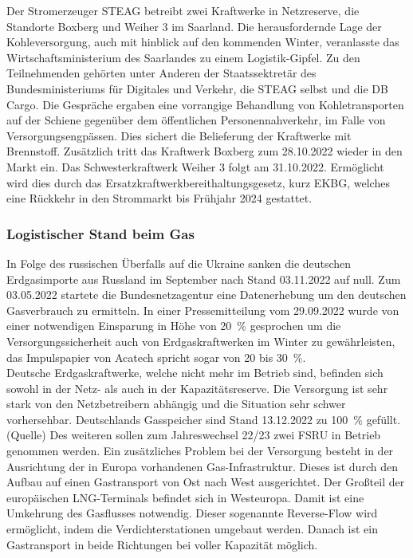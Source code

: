 	Der Stromerzeuger STEAG betreibt zwei Kraftwerke in Netzreserve, die Standorte Boxberg und Weiher 3 im Saarland. Die herausfordernde Lage der Kohleversorgung, auch mit hinblick auf den kommenden Winter, veranlasste das Wirtschaftsministerium des Saarlandes zu einem Logistik-Gipfel. Zu den Teilnehmenden gehörten unter Anderen der Staatssektretär des Bundesministeriums für Digitales und Verkehr, die STEAG selbst und die DB Cargo. Die Gespräche ergaben eine vorrangige Behandlung von Kohletransporten auf der Schiene gegenüber dem öffentlichen Personennahverkehr, im Falle von Versorgungsengpässen.\cite{Logistikgipfel_Saarland} Dies sichert die Belieferung der Kraftwerke mit Brennstoff. Zusätzlich tritt das Kraftwerk Boxberg zum 28.10.2022 wieder in den Markt ein. Das Schwesterkraftwerk Weiher 3 folgt am 31.10.2022. Ermöglicht wird dies durch das Ersatzkraftwerkbereithaltungsgesetz, kurz EKBG, welches eine Rückkehr in den Strommarkt bis Frühjahr 2024 gestattet.\cite{STEAG_Steinkohle} \\
	
	
	\subsubsection{Logistischer Stand beim Gas}
	In Folge des russischen Überfalls auf die Ukraine sanken die deutschen Erdgasimporte aus Russland im September nach Stand 03.11.2022 auf null. Zum 03.05.2022 startete die Bundesnetzagentur eine Datenerhebung um den deutschen Gasverbrauch zu ermitteln.\cite{Datenerhebung_Gas} In einer Pressemitteilung vom 29.09.2022 wurde von einer notwendigen Einsparung in Höhe von \SI{20}{\percent} gesprochen um die Versorgungssicherheit auch von Erdgaskraftwerken im Winter zu gewährleisten, das Impulspapier von Acatech spricht sogar von 20 bis \SI{30}{\percent}.\cite{Impuls_Acatech_Einsparung}\\
	
	Deutsche Erdgaskraftwerke, welche nicht mehr im Betrieb sind, befinden sich sowohl in der Netz- als auch in der Kapazitätsreserve. Die Versorgung ist sehr stark von den Netzbetreibern abhängig und die Situation sehr schwer vorhersehbar. Deutschlands Gasspeicher sind Stand 13.12.2022 zu \SI{100}{\percent} gefüllt.(Quelle) Des weiteren sollen zum Jahreswechsel 22/23 zwei FSRU in Betrieb genommen werden.\cite{LNG_FSRU}
	Ein zusätzliches Problem bei der Versorgung besteht in der Ausrichtung der in Europa vorhandenen Gas-Infrastruktur. Dieses ist durch den Aufbau auf einen Gastransport von Ost nach West ausgerichtet. Der Großteil der europäischen LNG-Terminals befindet sich in Westeuropa. Damit ist eine Umkehrung des Gasflusses notwendig. Dieser sogenannte Reverse-Flow wird ermöglicht, indem die Verdichterstationen umgebaut werden. Danach ist ein Gastransport in beide Richtungen bei voller Kapazität möglich.\cite{Impuls_Acatech_Reverse_Flow} \\
	
